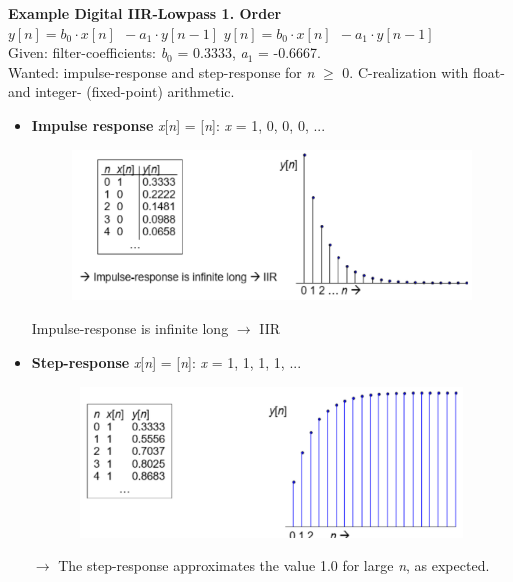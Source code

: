 {\rot\bf Example Digital IIR-Lowpass 1. Order }\\

$y[n]=b_{0} \cdot x[n]\; \, -a_{1} \cdot y[n-1]$ $y[n]=b_{0} \cdot x[n]\; \, -a_{1} \cdot y[n-1]$ \\

Given:   filter-coefficients: \textit{b}${}_{0}$ = 0.3333, \textit{a}${}_{1}$ = -0.6667. \\
Wanted:  impulse-response and step-response for \textit{n} $\mathrm{\ge}$ 0.     C-realization with float- and integer- (fixed-point) arithmetic.

\begin{itemize}
\item \textbf{Impulse response}  \textit{x}[\textit{n}] = [\textit{n}]:   \textit{x} = { 1, 0, 0, 0, ...}
    \begin{figure}[h]
    \centering
    \includegraphics[width=12cm, height=4cm]{Images/image144.png}
    \label{fig:Fig }
    \end{figure}

Impulse-response is infinite long \hspace{1cm} $\rightarrow$ IIR
\newpage
\item \textbf{Step-response} \textit{x}[\textit{n}] = [\textit{n}]:   \textit{x} = {1, 1, 1, 1, ...}
	\begin{figure}[h]
    \centering
    \includegraphics[width=12cm, height=4cm]{Images/image145.png}
    \label{fig:Fig }
    \end{figure}

$\rightarrow$ The step-response approximates the value 1.0 for large \textit{n}, as expected.

\end{itemize}

